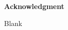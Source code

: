 \thispagestyle{empty}
\begin{center}
    \vspace*{2.5cm}
    \large
    \textbf{Acknowledgment}
\end{center}
Blank

\clearpage